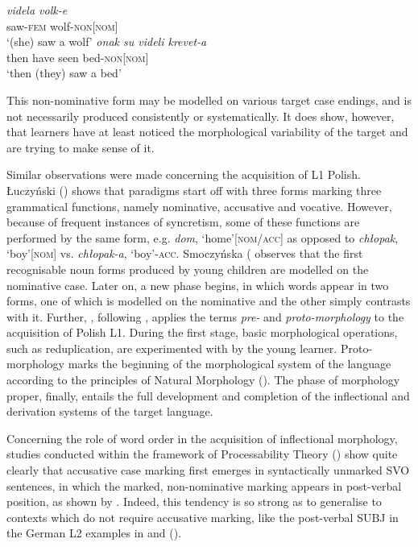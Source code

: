 \ea%
    \label{ex:01:4}
    \ea
    \label{ex:01:4a}
    \gll    \textit{videla volk-e}\\
            saw-\textsc{fem}  wolf-\textsc{non[nom]}\\
    \glt    ‘(she) saw a wolf’
    \ex
    \label{ex:01:4b}
    \gll    \textit{onak su videli krevet-a}\\
            then  have  seen  bed-\textsc{non[nom]}\\
    \glt    ‘then (they) saw a bed’
    \z
\z

This non-nominative form may be modelled on various target case endings, and is not necessarily produced consistently or systematically. It does show, however, that learners have at least noticed the morphological variability of the target and are trying to make sense of it.

Similar observations were made concerning the acquisition of L1 Polish. Łuczyński (\citeyear{Łuczyński2002, Łuczyński2004, Łuczyński2010}) shows that paradigms start off with three forms marking three grammatical functions, namely nominative, accusative and vocative. However, because of frequent instances of syncretism, some of these functions are performed by the same form, e.g. \textit{dom}, ‘home’\textsc{[nom/acc]} as opposed to \textit{chłopak}, ‘boy’\textsc{[nom]} vs. \textit{chłopak-a}, ‘boy’-\textsc{acc}. Smoczyńska (\citeyear{Smoczyńska1972, Smoczyńska1985, Smoczyńska1997} observes that the first recognisable noun forms produced by young children are modelled on the nominative case. Later on, a new phase begins, in which words appear in two forms, one of which is modelled on the nominative and the other simply contrasts with it. Further, \citet{Dziubalska-Kołaczyk1997}, following \citet{DresslerKarpf1994}, applies the terms \textit{pre-} and \textit{proto-morphology} to the acquisition of Polish L1. During the first stage, basic morphological operations, such as reduplication, are experimented with by the young learner. Proto-morphology marks the beginning of the morphological system of the language according to the principles of Natural Morphology (\citealt{Dressler1985, Dressler1987, Dressler2011, Wurzel1989, Crocco-Galeas1998}). The phase of morphology proper, finally, entails the full development and completion of the inflectional and derivation systems of the target language.

Concerning the role of word order in the acquisition of inflectional morphology, studies conducted within the framework of Processability Theory (\citealt{Pienemann1998, Pienemann2015, Di-BiaseBettoni2015}) show quite clearly that accusative case marking first emerges in syntactically unmarked SVO sentences, in which the marked, non-nominative marking appears in post-verbal position, as shown by  \citet[190]{ArtoniMagnani2015} . Indeed, this tendency is so strong as to generalise to contexts which do not require accusative marking, like the post-verbal SUBJ in the German L2 examples in  \citep[490]{Baten2011} and  (\citealt[235]{DiehlEtAl2000}).

